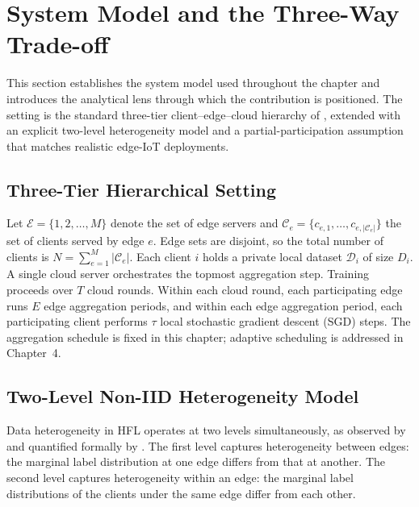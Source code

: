 \section{System Model and the Three-Way Trade-off}
\label{sec:fedge-system}

This section establishes the system model used throughout the chapter and introduces the analytical lens through which the contribution is positioned. The setting is the standard three-tier client--edge--cloud hierarchy of \cite{liu2020hierfavg}, extended with an explicit two-level heterogeneity model and a partial-participation assumption that matches realistic edge-IoT deployments.

\subsection{Three-Tier Hierarchical Setting}
\label{subsec:fedge-tiers}

Let $\mathcal{E} = \{1, 2, \ldots, M\}$ denote the set of edge servers and $\mathcal{C}_e = \{c_{e,1}, \ldots, c_{e,|\mathcal{C}_e|}\}$ the set of clients served by edge $e$. Edge sets are disjoint, so the total number of clients is $N = \sum_{e=1}^{M} |\mathcal{C}_e|$. Each client $i$ holds a private local dataset $\mathcal{D}_i$ of size $D_i$. A single cloud server orchestrates the topmost aggregation step. Training proceeds over $T$ cloud rounds. Within each cloud round, each participating edge runs $E$ edge aggregation periods, and within each edge aggregation period, each participating client performs $\tau$ local stochastic gradient descent (SGD) steps. The aggregation schedule is fixed in this chapter; adaptive scheduling is addressed in Chapter~4.

\subsection{Two-Level Non-IID Heterogeneity Model}
\label{subsec:fedge-noniid}

Data heterogeneity in HFL operates at two levels simultaneously, as observed by \cite{lee2025phefl} and quantified formally by \cite{fang2024hierarchical}. The first level captures heterogeneity between edges: the marginal label distribution at one edge differs from that at another. The second level captures heterogeneity within an edge: the marginal label distributions of the clients under the same edge differ from each other.

